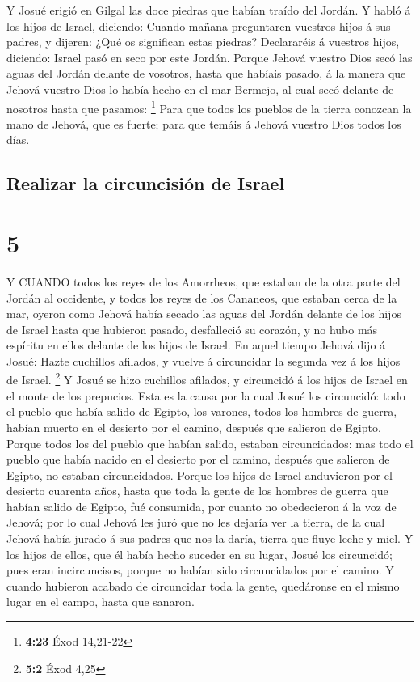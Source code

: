  Y Josué erigió en Gilgal las doce piedras que habían
traído del Jordán.  Y habló á los hijos de Israel,
diciendo: Cuando mañana preguntaren vuestros hijos á sus padres, y
dijeren: ¿Qué os significan estas piedras?  Declararéis á
vuestros hijos, diciendo: Israel pasó en seco por este Jordán.
 Porque Jehová vuestro Dios secó las aguas del Jordán
delante de vosotros, hasta que habíais pasado, á la manera que Jehová
vuestro Dios lo había hecho en el mar Bermejo, al cual secó delante de
nosotros hasta que pasamos: \footnote{\textbf{4:23} Éxod 14,21-22}
 Para que todos los pueblos de la tierra conozcan la mano
de Jehová, que es fuerte; para que temáis á Jehová vuestro Dios todos
los días.

\hypertarget{realizar-la-circuncisiuxf3n-de-israel}{%
\subsection{Realizar la circuncisión de
Israel}\label{realizar-la-circuncisiuxf3n-de-israel}}

\hypertarget{section-4}{%
\section{5}\label{section-4}}

 Y CUANDO todos los reyes de los Amorrheos, que estaban de
la otra parte del Jordán al occidente, y todos los reyes de los
Cananeos, que estaban cerca de la mar, oyeron como Jehová había secado
las aguas del Jordán delante de los hijos de Israel hasta que hubieron
pasado, desfalleció su corazón, y no hubo más espíritu en ellos delante
de los hijos de Israel.  En aquel tiempo Jehová dijo á
Josué: Hazte cuchillos afilados, y vuelve á circuncidar la segunda vez á
los hijos de Israel. \footnote{\textbf{5:2} Éxod 4,25}  Y
Josué se hizo cuchillos afilados, y circuncidó á los hijos de Israel en
el monte de los prepucios.  Esta es la causa por la cual
Josué los circuncidó: todo el pueblo que había salido de Egipto, los
varones, todos los hombres de guerra, habían muerto en el desierto por
el camino, después que salieron de Egipto.  Porque todos los
del pueblo que habían salido, estaban circuncidados: mas todo el pueblo
que había nacido en el desierto por el camino, después que salieron de
Egipto, no estaban circuncidados.  Porque los hijos de
Israel anduvieron por el desierto cuarenta años, hasta que toda la gente
de los hombres de guerra que habían salido de Egipto, fué consumida, por
cuanto no obedecieron á la voz de Jehová; por lo cual Jehová les juró
que no les dejaría ver la tierra, de la cual Jehová había jurado á sus
padres que nos la daría, tierra que fluye leche y miel.  Y
los hijos de ellos, que él había hecho suceder en su lugar, Josué los
circuncidó; pues eran incircuncisos, porque no habían sido circuncidados
por el camino.  Y cuando hubieron acabado de circuncidar
toda la gente, quedáronse en el mismo lugar en el campo, hasta que
sanaron.

